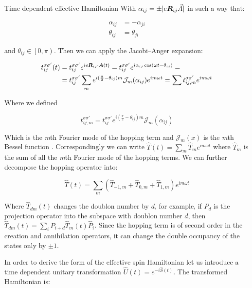 \begin{section}{Time dependent effective Hamiltonian}
With $\alpha_{ij} = \pm|e\boldsymbol{R}_{ij}\vec{A}|$ in such a way that:

\begin{align}
\alpha_{ij} &= -\alpha_{ji} \label{alphaSym} \\
\theta_{ij} &= \theta_{ji} \label{thetaSym}
\end{align}

and $\theta_{ij} \in \left[0,\pi\right)$. Then we can apply the Jacobi–Anger expansion:

\begin{align*}
t_{ij}^{\sigma \sigma'}(t) &= t_{ij}^{\sigma \sigma'}e^{ie\boldsymbol{R}_{ij}\cdot\boldsymbol{A}(t)} = t_{ij}^{\sigma \sigma'}e^{i\alpha_{ij} \cos(\omega t - \theta_{ij})} = \\
&= t_{ij}^{\sigma \sigma'}\sum_m e^{i(\frac{\pi}{2}-\theta_{ij})m} \mathcal{J}_m(\alpha_{ij}) e^{im\omega t} = \sum t_{ij,m}^{\sigma \sigma'} e^{im\omega t}
\end{align*}

Where we defined 

\begin{equation}
\label{HoppAmpFourier}
t_{ij,m}^{\sigma \sigma'} = t_{ij}^{\sigma \sigma'} e^{i(\frac{\pi}{2}-\theta_{ij})m} \mathcal{J}_m(\alpha_{ij})
\end{equation}

Which is the \textit{m}th Fourier mode of the hopping term and $\mathcal{J}_m(x)$ is the \textit{m}th Bessel function \cite{Kitamura2017}. Correspondingly we can write $\hat{T}(t) = \sum_m \hat{T}_m e^{im \omega t}$ where $\hat{T}_m$ is the sum of all the \textit{m}th Fourier mode of the hopping terms. We can further decompose the hopping operator into:

\begin{equation}
\hat{T}(t) = \sum_m (\hat{T}_{-1,m}+\hat{T}_{0,m}+\hat{T}_{1,m})e^{im\omega t}
\end{equation}

Where $\hat{T}_{dm}(t)$ changes the doublon number by $d$, for example, if $\hat{P}_d$ is the projection operator into the subspace with doublon number $d$, then $\hat{T}_{dm}(t) = \sum_i \hat{P}_{i+d}\hat{T}_{m}(t)\hat{P}_i$. Since the hopping term is of second order in the creation and annihilation operators, it can change the double occupancy of the states only by $\pm1$.

In order to derive the form of the effective spin Hamiltonian let us introduce a time dependent unitary transformation $\hat{U}(t) = e^{-i\hat{S}(t)}$. The transformed Hamiltonian is:


\end{section}
